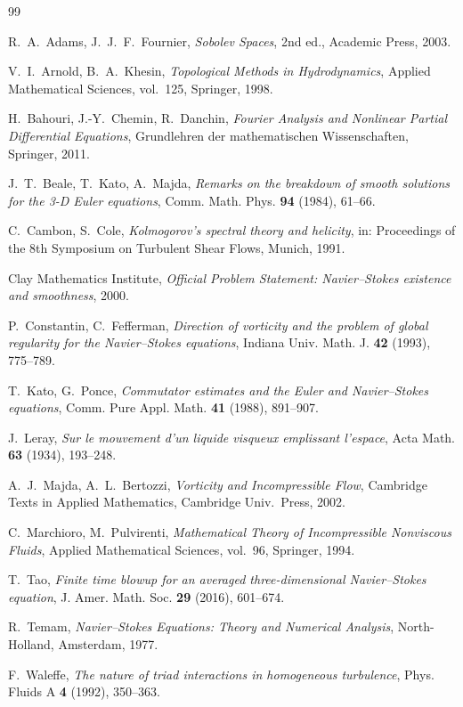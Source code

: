 \begin{thebibliography}{99}

R.~A.~Adams, J.~J.~F.~Fournier,
\emph{Sobolev Spaces}, 2nd ed., Academic Press, 2003.

V.~I.~Arnold, B.~A.~Khesin,
\emph{Topological Methods in Hydrodynamics},
Applied Mathematical Sciences, vol.~125, Springer, 1998.

H.~Bahouri, J.-Y.~Chemin, R.~Danchin,
\emph{Fourier Analysis and Nonlinear Partial Differential Equations},
Grundlehren der mathematischen Wissenschaften, Springer, 2011.

J.~T.~Beale, T.~Kato, A.~Majda,
\emph{Remarks on the breakdown of smooth solutions for the 
3-D Euler equations},
Comm. Math. Phys. \textbf{94} (1984), 61--66.

C.~Cambon, S.~Cole,
\emph{Kolmogorov's spectral theory and helicity},
in: Proceedings of the 8th Symposium on Turbulent Shear Flows, 
Munich, 1991.

Clay Mathematics Institute,
\emph{Official Problem Statement: Navier--Stokes existence and 
smoothness}, 2000.

P.~Constantin, C.~Fefferman,
\emph{Direction of vorticity and the problem of global regularity 
for the Navier--Stokes equations},
Indiana Univ. Math. J. \textbf{42} (1993), 775--789.

T.~Kato, G.~Ponce,
\emph{Commutator estimates and the Euler and Navier--Stokes equations},
Comm. Pure Appl. Math. \textbf{41} (1988), 891--907.

J.~Leray,
\emph{Sur le mouvement d'un liquide visqueux emplissant l'espace},
Acta Math. \textbf{63} (1934), 193--248.

A.~J.~Majda, A.~L.~Bertozzi,
\emph{Vorticity and Incompressible Flow},
Cambridge Texts in Applied Mathematics, Cambridge Univ.\ Press, 2002.

C.~Marchioro, M.~Pulvirenti,
\emph{Mathematical Theory of Incompressible Nonviscous Fluids},
Applied Mathematical Sciences, vol.~96, Springer, 1994.

T.~Tao,
\emph{Finite time blowup for an averaged three-dimensional 
Navier--Stokes equation},
J. Amer. Math. Soc. \textbf{29} (2016), 601--674.

R.~Temam,
\emph{Navier--Stokes Equations: Theory and Numerical Analysis},
North-Holland, Amsterdam, 1977.

F.~Waleffe,
\emph{The nature of triad interactions in homogeneous turbulence},
Phys. Fluids A \textbf{4} (1992), 350--363.

\end{thebibliography}
